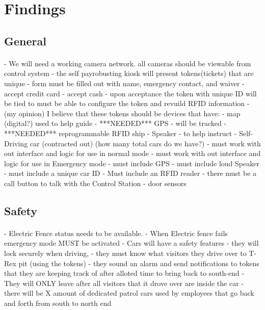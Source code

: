 \documentclass[12pt]{article}
\begin{document}
\section{Findings}
\paragraph{}
	\subsection{General}
	\paragraph{} 
	- We will need a working camera network. all cameras should be viewable from control system
	- the self payrobusting kiosk will present tokens(tickets) that are unique 
            - form must be filled out with name, emergency contact, and waiver
            - accept credit card
            - accept cash
            - upon acceptance the token with unique ID will be tied to 
            must be able to configure the token and revuild RFID information
        - (my opinion) I believe that these tokens should be devices that have:
            - map (digital?) used to help guide
            - ***NEEDED*** GPS - will be tracked
            - ***NEEDED*** reprogrammable RFID ship
            - Speaker - to help instruct 
        - Self-Driving car (contracted out) (how many total cars do we have?)
            - must work with out interface and logic for use in normal mode
            - must work with out interface and logic for use in Emergency mode
            - must include GPS
            - must include loud Speaker
            - must include a unique car ID
            - Must include an RFID reader
            - there must be a call button to talk with the Control Station
            - door sensors

	\paragraph{} 
	\paragraph{}
	
	\subsection{Safety}
	\paragraph{}
	        - Electric Fence status needs to be available.
        - When Electric fence fails emergency mode MUST be activated
        - Cars will have a safety features
            - they will lock securely when driving,
            - they must know what visitors they drive over to T-Rex pit (using the tokens)
            - they sound an alarm and send notifications to tokens that they are keeping track of after alloted time to bring back to south-end
            - They will ONLY leave after all visitors that it drove over are inside the car
            - there will be X amount of dedicated patrol cars used by employees that go back and forth from south to north end
\end{document}
